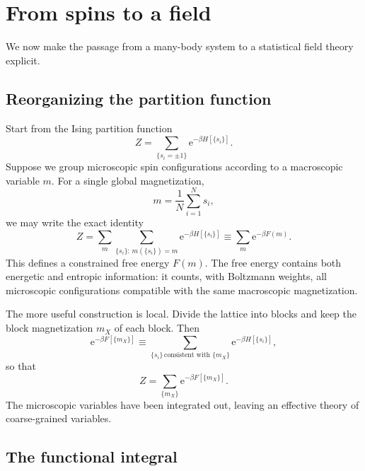 \documentclass[11pt]{article}
\newcommand{\e}{\mathrm{e}}
\begin{document}
\section{From spins to a field}

We now make the passage from a many-body system to a statistical field theory explicit.

\subsection{Reorganizing the partition function}

Start from the Ising partition function
\begin{equation}
  Z=\sum_{\{s_i=\pm1\}}\e^{-\beta H[\{s_i\}]}.
\end{equation}
Suppose we group microscopic spin configurations according to a macroscopic variable $m$.  For a single global magnetization,
\begin{equation}
  m=\frac{1}{N}\sum_{i=1}^N s_i,
\end{equation}
we may write the exact identity
\begin{equation}
  Z
  =\sum_m\sum_{\{s_i\}:\,m(\{s_i\})=m}\e^{-\beta H[\{s_i\}]}
  \equiv
  \sum_m \e^{-\beta F(m)}.
  \label{eq:globalF}
\end{equation}
This defines a constrained free energy $F(m)$.  The free energy contains both energetic and entropic information: it counts, with Boltzmann weights, all microscopic configurations compatible with the same macroscopic magnetization.

The more useful construction is local.  Divide the lattice into blocks and keep the block magnetization $m_X$ of each block.  Then
\begin{equation}
  \e^{-\beta F[\{m_X\}]}
  \equiv
  \sum_{\{s_i\}\,\text{consistent with }\{m_X\}}
  \e^{-\beta H[\{s_i\}]},
  \label{eq:constrainedF}
\end{equation}
so that
\begin{equation}
  Z=\sum_{\{m_X\}}\e^{-\beta F[\{m_X\}]}.
  \label{eq:latticefunctional}
\end{equation}
The microscopic variables have been integrated out, leaving an effective theory of coarse-grained variables.

\subsection{The functional integral}
\end{document}

